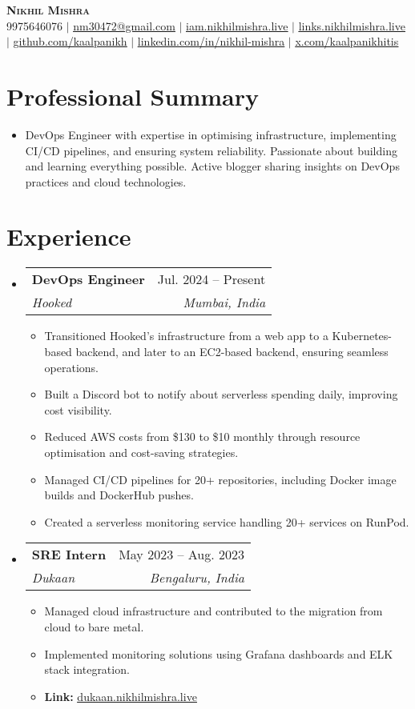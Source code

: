 \documentclass[letterpaper,11pt]{article}
\makeatletter
\newcommand{\resumeItem}[1]{
  \item\small{
    {#1 \vspace{-2pt}}
  }
}
\newcommand{\resumeSubheading}[4]{
  \vspace{-2pt}\item
    \begin{tabular*}{0.97\textwidth}[t]{l@{\extracolsep{\fill}}r}
      \textbf{#1} & #2 \\
      \textit{\small#3} & \textit{\small #4} \\
    \end{tabular*}\vspace{-7pt}
}
\newcommand{\resumeSubHeadingListStart}{\begin{itemize}[leftmargin=0.15in, label={}]}
\newcommand{\resumeSubHeadingListEnd}{\end{itemize}}
\newcommand{\resumeItemListStart}{\begin{itemize}}
\newcommand{\resumeItemListEnd}{\end{itemize}\vspace{-5pt}}
\makeatother
\begin{document}
\begin{center}
    \textbf{\Huge \scshape Nikhil Mishra} \\ \vspace{1pt}
    \small  9975646076 $|$ \href{mailto:nm30472@gmail.com}{\underline{nm30472@gmail.com}} $|$ 
    \href{https://iam.nikhilmishra.live}{\underline{iam.nikhilmishra.live}} $|$
    \href{https://links.nikhilmishra.live}{\underline{links.nikhilmishra.live}} $|$
    \href{https://github.com/kaalpanikh}{\underline{github.com/kaalpanikh}} $|$
    \href{https://linkedin.com/in/nikhil-mishra}{\underline{linkedin.com/in/nikhil-mishra}} $|$
    \href{https://x.com/kaalpanikhitis}{\underline{x.com/kaalpanikhitis}}
\end{center}

\section{Professional Summary}
  \resumeSubHeadingListStart
    \item{
      DevOps Engineer with expertise in optimising infrastructure, implementing CI/CD pipelines, and ensuring system reliability. Passionate about building and learning everything possible. Active blogger sharing insights on DevOps practices and cloud technologies.
    }
  \resumeSubHeadingListEnd

\section{Experience}
  \resumeSubHeadingListStart
    \resumeSubheading
      {DevOps Engineer}{Jul. 2024 -- Present}
      {Hooked}{Mumbai, India}
      \resumeItemListStart
        \resumeItem{Transitioned Hooked's infrastructure from a web app to a Kubernetes-based backend, and later to an EC2-based backend, ensuring seamless operations.}
        \resumeItem{Built a Discord bot to notify about serverless spending daily, improving cost visibility.}
        \resumeItem{Reduced AWS costs from \$130 to \$10 monthly through resource optimisation and cost-saving strategies.}
        \resumeItem{Managed CI/CD pipelines for 20+ repositories, including Docker image builds and DockerHub pushes.}
        \resumeItem{Created a serverless monitoring service handling 20+ services on RunPod.}
      \resumeItemListEnd
    
    \resumeSubheading
      {SRE Intern}{May 2023 -- Aug. 2023}
      {Dukaan}{Bengaluru, India}
      \resumeItemListStart
        \resumeItem{Managed cloud infrastructure and contributed to the migration from cloud to bare metal.}
        \resumeItem{Implemented monitoring solutions using Grafana dashboards and ELK stack integration.}
        \resumeItem{\textbf{Link:} \href{https://dukaan.nikhilmishra.live}{\underline{dukaan.nikhilmishra.live}}}
      \resumeItemListEnd
  \resumeSubHeadingListEnd
\end{document}
